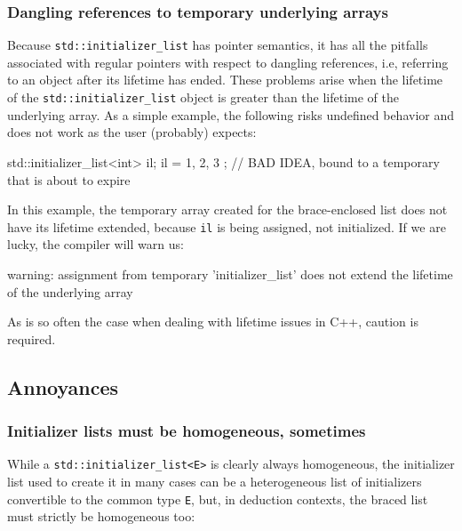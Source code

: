 \subsubsection[Dangling references to temporary underlying arrays]{Dangling references to temporary underlying arrays}\label{dangling-references-to-temporary-underlying-arrays}

Because \lstinline!std::initializer_list! has pointer semantics, it has
all the pitfalls associated with regular pointers with respect to
dangling references, i.e, referring to an object after its lifetime has
ended. These problems arise when the lifetime of the
\lstinline!std::initializer_list! object is greater than the lifetime of
the underlying array. As a simple example, the following risks undefined
behavior and does not work as the user (probably) expects:

\begin{emcppslisting}
std::initializer_list<int> il;
il = { 1, 2, 3 };  // BAD IDEA, bound to a temporary that is about to expire
\end{emcppslisting}
    

\noindent In this example, the temporary array created for the brace-enclosed list
does not have its lifetime extended, because \lstinline!il! is being
assigned, not initialized. If we are lucky, the compiler will warn us:

\begin{emcppslisting}[style=plain]
warning: assignment from temporary 'initializer_list' does not extend the lifetime 
of the underlying array
\end{emcppslisting}
    

\noindent As is so often the case when dealing with lifetime issues in C++,
caution is required.

\subsection[Annoyances]{Annoyances}\label{annoyances-initializerlist}

\subsubsection[Initializer lists must be homogeneous, sometimes]{Initializer lists must be homogeneous, sometimes}\label{initializer-lists-must-be-homogeneous,-sometimes}

While a \lstinline!std::initializer_list<E>! is clearly always
homogeneous, the initializer list used to create it in many cases can be
a heterogeneous list of initializers convertible to the common type
\lstinline!E!, but, in deduction contexts, the braced list must strictly be
homogeneous too:

